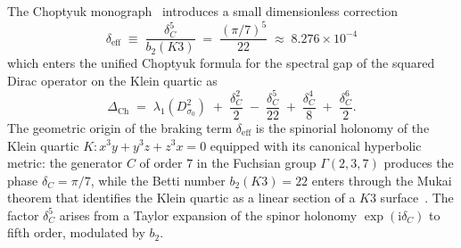 \documentclass[11pt,a4paper]{article}
\newcommand{\dC}{\delta_C}
\newcommand{\deff}{\delta_{\mathrm{eff}}}
\providecommand{\ii}{}
\renewcommand{\ii}{\mathrm{i}}
\theoremstyle{plain}
\theoremstyle{definition}
\theoremstyle{remark}
\begin{document}
The Choptyuk monograph~\cite{isaev2024spinor} introduces a small
dimensionless correction
\begin{equation}\label{eq:aC-def}
  \boxed{\;\deff \;\equiv\; \frac{\dC^5}{b_2(K3)}
       \;=\; \frac{(\pi/7)^5}{22} \;\approx\; 8.276\times 10^{-4}\;}
\end{equation}
which enters the unified Choptyuk formula for the spectral gap of the
squared Dirac operator on the Klein quartic as
\begin{equation}\label{eq:choptyuk-formula}
  \Delta_{\mathrm{Ch}} \;=\; \lambda_1(D^2_{\sigma_0})
       \;+\; \frac{\dC^2}{2}
       \;-\; \frac{\dC^5}{22}
       \;+\; \frac{\dC^4}{8}
       \;+\; \frac{\dC^6}{2}.
\end{equation}
The geometric origin of the braking term $\deff$ is the spinorial
holonomy of the Klein quartic $K\colon x^3 y + y^3 z + z^3 x = 0$
equipped with its canonical hyperbolic metric: the generator $C$ of
order $7$ in the Fuchsian group $\Gamma(2,3,7)$ produces the phase
$\dC = \pi/7$, while the Betti number $b_2(K3) = 22$ enters through the
Mukai theorem that identifies the Klein quartic as a linear section of
a $K3$ surface~\cite{mukai1988k3,beauville2008k3}.  The factor $\dC^5$
arises from a Taylor expansion of the spinor holonomy $\exp(\ii\dC)$ to
fifth order, modulated by $b_2$.
\end{document}
